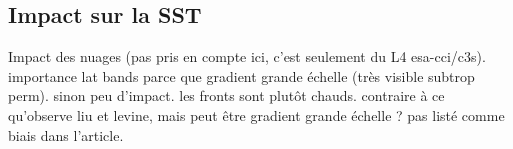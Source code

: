 \subsection{Impact sur la SST}
\label{sec:res-sst}

Impact des nuages (pas pris en compte ici, c'est seulement du L4 esa-cci/c3s).
importance lat bands parce que gradient grande échelle (très visible subtrop perm).
sinon peu d'impact. les fronts sont plutôt chauds.
contraire à ce qu'observe liu et levine, mais peut être gradient grande échelle ? pas listé comme biais dans l'article.

\begin{figure}
  \centering
  \label{fig:ts-cli-sst}
\end{figure}
